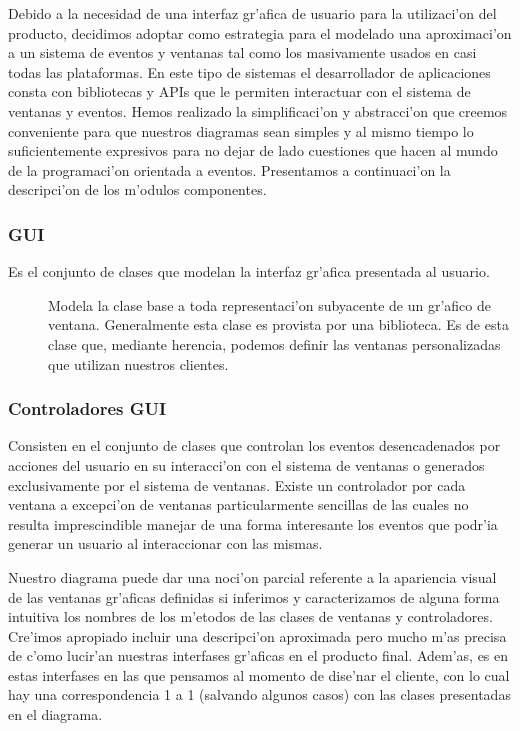Debido a la necesidad de una interfaz gr'afica de usuario para la utilizaci'on del producto, decidimos adoptar como estrategia para el modelado una aproximaci'on a un sistema de eventos y ventanas tal como los masivamente usados en casi todas las plataformas. En este tipo de sistemas el desarrollador de aplicaciones consta con bibliotecas y APIs que le permiten interactuar con el sistema de ventanas y eventos. Hemos realizado la simplificaci'on y abstracci'on que creemos conveniente para que nuestros diagramas sean simples y al mismo tiempo lo suficientemente expresivos para no dejar de lado cuestiones que hacen al mundo de la programaci'on orientada a eventos.
Presentamos a continuaci'on la descripci'on de los m'odulos componentes.

\subsubsection{GUI}
Es el conjunto de clases que modelan la interfaz gr'afica presentada al usuario.


\begin{description}
\item[] Modela la clase base a toda representaci'on subyacente de un gr'afico de ventana. Generalmente esta clase es provista por una biblioteca. Es de esta clase que, mediante herencia, podemos definir las ventanas personalizadas que utilizan nuestros clientes.
\end{description}

\subsubsection{Controladores GUI}
Consisten en el conjunto de clases que controlan los eventos desencadenados por acciones del usuario en su interacci'on con el sistema de ventanas o generados exclusivamente por el sistema de ventanas. Existe un controlador por cada ventana a excepci'on de ventanas particularmente sencillas de las cuales no resulta imprescindible manejar de una forma interesante los eventos que podr'ia generar un usuario al interaccionar con las mismas.

Nuestro diagrama puede dar una noci'on parcial referente a la apariencia visual de las ventanas gr'aficas definidas si inferimos y caracterizamos de alguna forma intuitiva los nombres de los m'etodos de las clases de ventanas y controladores. Cre'imos apropiado incluir una descripci'on aproximada pero mucho m'as precisa de c'omo lucir'an nuestras interfases gr'aficas en el producto final. Adem'as, es en estas interfases en las que pensamos al momento de dise'nar el cliente, con lo cual hay una correspondencia 1 a 1 (salvando algunos casos) con las clases presentadas en el diagrama.

